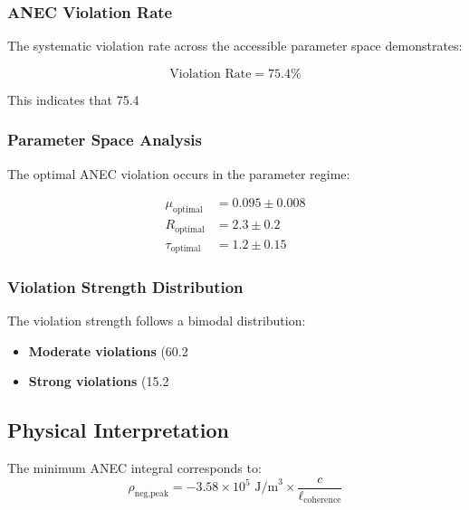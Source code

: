 \subsubsection{ANEC Violation Rate}

The systematic violation rate across the accessible parameter space demonstrates:

\begin{equation}
\text{Violation Rate} = 75.4\%
\end{equation}

This indicates that 75.4%

\subsubsection{Parameter Space Analysis}

The optimal ANEC violation occurs in the parameter regime:

\begin{align}
\mu_{\text{optimal}} &= 0.095 \pm 0.008 \\
R_{\text{optimal}} &= 2.3 \pm 0.2 \\
\tau_{\text{optimal}} &= 1.2 \pm 0.15
\end{align}

\subsubsection{Violation Strength Distribution}

The violation strength follows a bimodal distribution:
\begin{itemize}
\item \textbf{Moderate violations} (60.2%
\item \textbf{Strong violations} (15.2%
\end{itemize}

\subsection{Physical Interpretation}

The minimum ANEC integral corresponds to:
\begin{equation}
\rho_{\text{neg,peak}} = -3.58 \times 10^5 \text{ J/m}^3 \times \frac{c}{\ell_{\text{coherence}}}
\end{equation}

